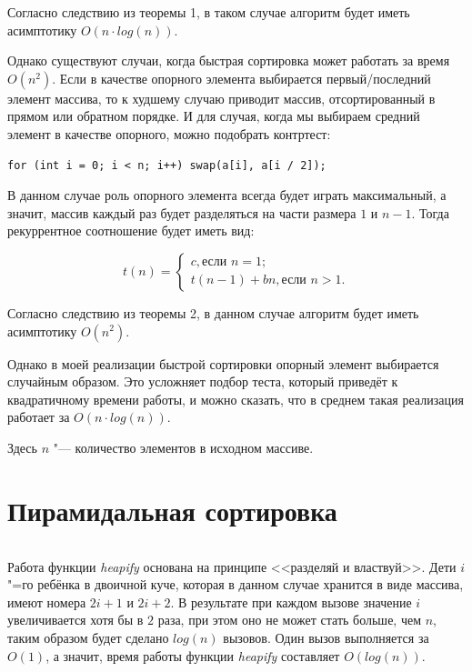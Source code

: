 \documentclass[otchet]{../SCWorks}
\begin{document}
Согласно следствию из теоремы 1, в таком случае алгоритм будет иметь асимптотику $O(n \cdot log(n))$.

Однако существуют случаи, когда быстрая сортировка может работать за время $O(n^2)$. Если в качестве опорного элемента выбирается первый/последний элемент массива, то к худшему случаю приводит массив, отсортированный в прямом или обратном порядке. И для случая, когда мы выбираем средний элемент в качестве опорного, можно подобрать контртест:
\begin{verbatim}
for (int i = 0; i < n; i++) swap(a[i], a[i / 2]);
\end{verbatim}

В данном случае роль опорного элемента всегда будет играть максимальный, а значит, массив каждый раз будет разделяться на части размера $1$ и $n - 1$. Тогда рекуррентное соотношение будет иметь вид:

\begin{equation}
	t(n) =
\begin{cases}
	c, \text{если } n = 1; \\
	t(n - 1) + bn, \text{если } n > 1.
\end{cases}
\end{equation}

Согласно следствию из теоремы 2, в данном случае алгоритм будет иметь асимптотику $O(n^2)$.

Однако в моей реализации быстрой сортировки опорный элемент выбирается случайным образом. Это усложняет подбор теста, который приведёт к квадратичному времени работы, и можно сказать, что в среднем такая реализация работает за $O(n \cdot log(n))$.

Здесь $n$ "--- количество элементов в исходном массиве.

\section{Пирамидальная сортировка}
\small
\inputminted[breaklines]{cpp}{./heap_sort.cpp}
\normalsize

Работа функции \textit{heapify} основана на принципе <<разделяй и властвуй>>. Дети $i$"=го ребёнка в двоичной куче, которая в данном случае хранится в виде массива, имеют номера $2i + 1$ и $2i + 2$. В результате при каждом вызове значение $i$ увеличивается хотя бы в $2$ раза, при этом оно не может стать больше, чем $n$, таким образом будет сделано $log(n)$ вызовов. Один вызов выполняется за $O(1)$, а значит, время работы функции \textit{heapify} составляет $O(log(n))$.
\end{document}

